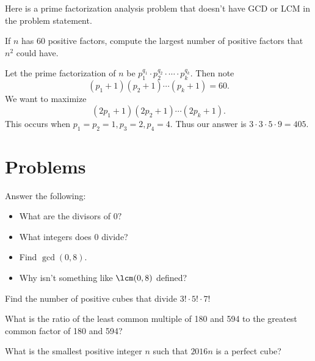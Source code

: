 \documentclass[mast]{lucky}
\begin{document}
Here is a prime factorization analysis problem that doesn't have GCD or LCM in the problem statement.
\begin{exam}[ARML 2008]
If $n$ has $60$ positive factors, compute the largest number of positive factors that $n^2$ could have.
\end{exam}
\begin{sol}
Let the prime factorization of $n$ be $p_1^{q_1}\cdot p_2^{q_2}\cdot\cdots\cdot p_k^{q_k}.$ Then note
\[(p_1+1)(p_2+1)\cdots(p_k+1)=60.\]
We want to maximize
\[(2p_1+1)(2p_2+1)\cdots(2p_k+1).\]
This occurs when $p_1=p_2=1,p_3=2,p_4=4.$ Thus our answer is $3\cdot 3\cdot 5\cdot 9=405.$
\end{sol}

\pagebreak

\section{Problems}



\begin{prob}[]{1}
Answer the following:
\begin{itemize}
\item What are the divisors of $0?$

\item What integers does $0$ divide?

\item Find $\gcd(0,8).$

\item Why isn't something like $\lcm(0,8)$ defined?
\end{itemize}

\end{prob}

\begin{prob}[AMC 10A 2005/15]{1}
Find the number of positive cubes that divide $3! \cdot 5! \cdot 7!$
\end{prob}

\begin{prob}[AMC 8 2013/10]{1}
What is the ratio of the least common multiple of 180 and 594 to the greatest common factor of 180 and 594?
\end{prob}

\begin{req}[PUMaC 2016]{2}
What is the smallest positive integer $n$ such that $2016n$ is a perfect cube?
\end{req}
\end{document}
